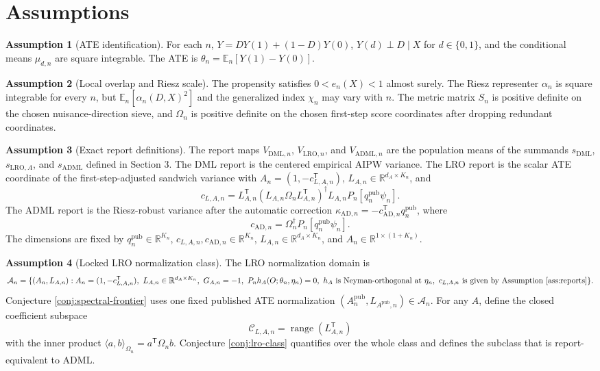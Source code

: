 \documentclass[11pt]{article}
\newcommand{\E}{\mathbb{E}}
\newcommand{\transpose}{\mathsf{T}}
\newcommand{\R}{\mathbb{R}}
\theoremstyle{definition}
\newtheorem{assumption}{Assumption}
\theoremstyle{plain}
\theoremstyle{remark}
\begin{document}
\section{Assumptions}
\begin{assumption}[ATE identification]\label{ass:ate-id}
For each \(n\), \(Y=DY(1)+(1-D)Y(0)\), \(Y(d)\perp D\mid X\) for
\(d\in\{0,1\}\), and the conditional means \(\mu_{d,n}\) are square
integrable.  The ATE is \(\theta_n=\E_n[Y(1)-Y(0)]\).
\end{assumption}

\begin{assumption}[Local overlap and Riesz scale]\label{ass:overlap}
The propensity satisfies \(0<e_n(X)<1\) almost surely.  The Riesz representer
\(\alpha_n\) is square integrable for every \(n\), but
\(\E_n[\alpha_n(D,X)^2]\) and the generalized index \(\chi_n\) may vary with
\(n\).  The metric matrix \(S_n\) is positive definite on the chosen
nuisance-direction sieve, and \(\Omega_n\) is positive definite on the chosen
first-step score coordinates after dropping redundant coordinates.
\end{assumption}

\begin{assumption}[Exact report definitions]\label{ass:reports}
The report maps \(V_{\mathrm{DML},n}\), \(V_{\mathrm{LRO},n}\), and
\(V_{\mathrm{ADML},n}\) are the population means of the summands
\(s_{\mathrm{DML}}\), \(s_{\mathrm{LRO},A}\), and \(s_{\mathrm{ADML}}\)
defined in Section 3.  The DML report is the centered empirical AIPW variance.
The LRO report is the scalar ATE coordinate of the first-step-adjusted
sandwich variance with \(A_n=(1,-c_{L,A,n}^{\transpose})\),
\(L_{A,n}\in\R^{d_A\times K_n}\), and
\[
c_{L,A,n}
=L_{A,n}^{\transpose}(L_{A,n}\Omega_nL_{A,n}^{\transpose})^\dagger
L_{A,n}P_n[q^{\mathrm{pub}}_n\psi_n].
\]
The ADML report is the Riesz-robust variance after the automatic correction
\(\kappa_{\mathrm{AD},n}=-c_{\mathrm{AD},n}^{\transpose}q^{\mathrm{pub}}_n\),
where
\[
c_{\mathrm{AD},n}=\Omega_n^\dagger P_n[q^{\mathrm{pub}}_n\psi_n].
\]
The dimensions are fixed by \(q^{\mathrm{pub}}_n\in\R^{K_n}\),
\(c_{L,A,n},c_{\mathrm{AD},n}\in\R^{K_n}\),
\(L_{A,n}\in\R^{d_A\times K_n}\), and
\(A_n\in\R^{1\times(1+K_n)}\).
\end{assumption}

\begin{assumption}[Locked LRO normalization class]\label{ass:lro-class}
The LRO normalization domain is
\[
\mathcal A_n=\{(A_n,L_{A,n}): A_n=(1,-c_{L,A,n}^{\transpose}),\
L_{A,n}\in\R^{d_A\times K_n},\
G_{A,n}=-1,\ P_n h_A(O;\theta_n,\eta_n)=0,\ 
h_A\text{ is Neyman-orthogonal at }\eta_n,\ 
c_{L,A,n}\text{ is given by Assumption \ref{ass:reports}}\}.
\]
Conjecture \ref{conj:spectral-frontier} uses one fixed published ATE
normalization \((A_n^{\mathrm{pub}},L_{A^{\mathrm{pub}},n})\in\mathcal A_n\).
For any \(A\), define the closed coefficient subspace
\[
\mathcal C_{L,A,n}=\operatorname{range}(L_{A,n}^{\transpose})
\]
with the inner product \(\langle a,b\rangle_{\Omega_n}=a^\transpose
\Omega_nb\).  Conjecture
\ref{conj:lro-class} quantifies over the whole class and defines the
subclass that is report-equivalent to ADML.
\end{assumption}
\end{document}
